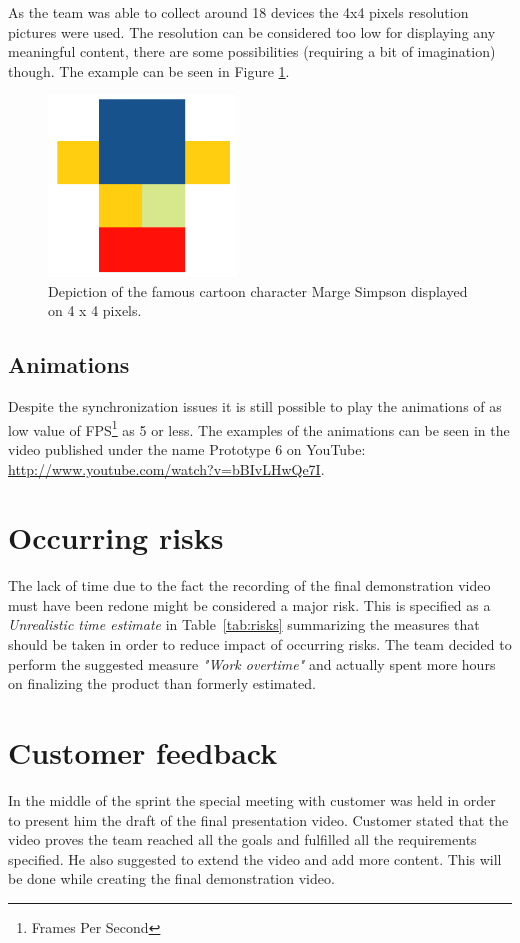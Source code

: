 As the team was able to collect around 18 devices the 4x4 pixels resolution pictures were used. The resolution can be considered too low for displaying any meaningful content, there are some possibilities (requiring a bit of imagination) though. The example can be seen in Figure \ref{fig:sprint6_marge}.

\begin{figure}[H]
	\centering
		\includegraphics[width=5cm]{./sprint6/marge.png}
	\caption{Depiction of the famous cartoon character Marge Simpson displayed on 4 x 4 pixels.}
	\label{fig:sprint6_marge}
\end{figure}

\subsection{Animations}
Despite the synchronization issues it is still possible to play the animations of as low value of FPS\footnote{Frames Per Second} as 5 or less. The examples of the animations can be seen in the video published under the name Prototype 6 on YouTube: \url{http://www.youtube.com/watch?v=bBIvLHwQe7I}.

\section{Occurring risks}
The lack of time due to the fact the recording of the final demonstration video must have been redone might be considered a major risk. This is specified as a \textit{Unrealistic time estimate} in Table~\ref{tab:risks} summarizing the measures that should be taken in order to reduce impact of occurring risks. The team decided to perform the suggested measure \textit{"Work overtime"} and actually spent more hours on finalizing the product than formerly estimated.

\section{Customer feedback}
In the middle of the sprint the special meeting with customer was held in order to present him the draft of the final presentation video. Customer stated that the video proves the team reached all the goals and fulfilled all the requirements specified. He also suggested to extend the video and add more content. This will be done while creating the final demonstration video.

